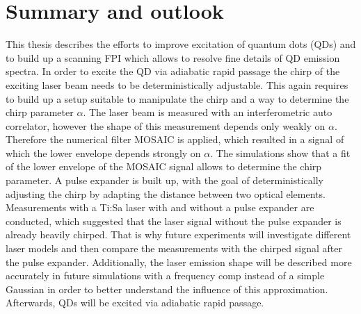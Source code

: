 \chapter{Summary and outlook}
\label{cha:summary}
This thesis describes the efforts to improve excitation of quantum dots (\ac{QD}s) and to build up a scanning \acl{FPI} which allows to resolve fine details of \ac{QD} emission spectra.
In order to excite the \ac{QD} via adiabatic rapid passage the chirp of the exciting laser beam needs to be deterministically adjustable.
This again requires to build up a setup suitable to manipulate the chirp and a way to determine the chirp parameter $\alpha$.
The laser beam is measured with an interferometric auto correlator, however the shape of this measurement depends only weakly on $\alpha$.
Therefore the numerical filter \ac{MOSAIC} is applied, which resulted in a signal of which the lower envelope depends strongly on $\alpha$.
The simulations show that a fit of the lower envelope of the \ac{MOSAIC} signal allows to determine the chirp parameter.
A pulse expander is built up, with the goal of deterministically adjusting the chirp by adapting the distance between two optical elements.
Measurements with a Ti:Sa laser with and without a pulse expander are conducted, which suggested that the laser signal without the pulse expander is already heavily chirped.
That is why future experiments will investigate different laser models and then compare the measurements with the chirped signal after the pulse expander.
Additionally, the laser emission shape will be described more accurately in future simulations with a frequency comp instead of a simple Gaussian in order to better understand the influence of this approximation.
Afterwards, \acp{QD} will be excited via adiabatic rapid passage.

